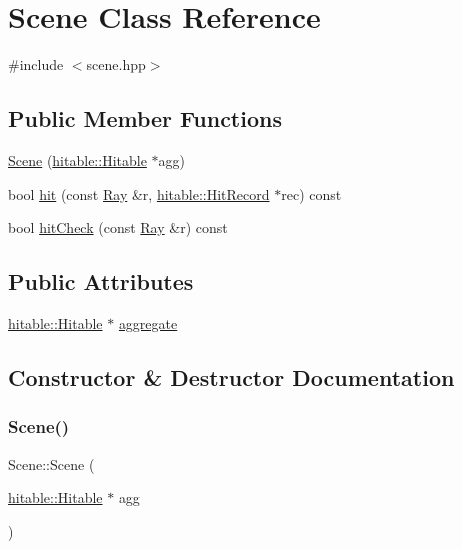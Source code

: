 \hypertarget{classScene}{}\section{Scene Class Reference}
\label{classScene}


{\ttfamily \#include $<$scene.\+hpp$>$}

\subsection*{Public Member Functions}
\begin{DoxyCompactItemize}
\item 
\mbox{\hyperlink{classScene_a343b576b538e37afc825becb0e660a51}{Scene}} (\mbox{\hyperlink{classhitable_1_1Hitable}{hitable\+::\+Hitable}} $\ast$agg)
\item 
bool \mbox{\hyperlink{classScene_a139243fe9086c529bdabd2985ad3dd0f}{hit}} (const \mbox{\hyperlink{classRay}{Ray}} \&r, \mbox{\hyperlink{structhitable_1_1HitRecord}{hitable\+::\+Hit\+Record}} $\ast$rec) const
\item 
bool \mbox{\hyperlink{classScene_aaebf4813260650cf523d7a4982cac4e2}{hit\+Check}} (const \mbox{\hyperlink{classRay}{Ray}} \&r) const
\end{DoxyCompactItemize}
\subsection*{Public Attributes}
\begin{DoxyCompactItemize}
\item 
\mbox{\hyperlink{classhitable_1_1Hitable}{hitable\+::\+Hitable}} $\ast$ \mbox{\hyperlink{classScene_aa972799824cf0c7e0c11dbc59fcbcb7b}{aggregate}}
\end{DoxyCompactItemize}


\subsection{Constructor \& Destructor Documentation}
\mbox{\label{classScene_a343b576b538e37afc825becb0e660a51}} 
\subsubsection{\texorpdfstring{Scene()}{Scene()}}
{\footnotesize\ttfamily Scene\+::\+Scene (\begin{DoxyParamCaption}\item[{\mbox{\hyperlink{classhitable_1_1Hitable}{hitable\+::\+Hitable}} $\ast$}]{agg }\end{DoxyParamCaption})}



